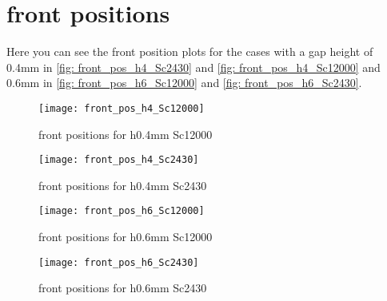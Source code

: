 \documentclass[../thesis.tex]{subfiles}
\begin{document}
\section{front positions}

Here you can see the front position plots for the cases with a gap height of 0.4mm in \autoref{fig: front_pos_h4_Sc2430} and \autoref{fig: front_pos_h4_Sc12000} and 0.6mm in \autoref{fig: front_pos_h6_Sc12000} and \autoref{fig: front_pos_h6_Sc2430}.

\begin{figure}[htbp]
	\centering
	\texttt{[image: front\_pos\_h4\_Sc12000]}
	\caption{front positions for h0.4mm Sc12000\label{fig: front_pos_h4_Sc12000}}\bigskip
	\texttt{[image: front\_pos\_h4\_Sc2430]}
	\caption{front positions for h0.4mm Sc2430\label{fig: front_pos_h4_Sc2430}}
\end{figure}

\begin{figure}[htbp]
	\centering
	\texttt{[image: front\_pos\_h6\_Sc12000]}
	\caption{front positions for h0.6mm Sc12000\label{fig: front_pos_h6_Sc12000}}\bigskip
	\texttt{[image: front\_pos\_h6\_Sc2430]}
	\caption{front positions for h0.6mm Sc2430\label{fig: front_pos_h6_Sc2430}}
\end{figure}
\end{document}
